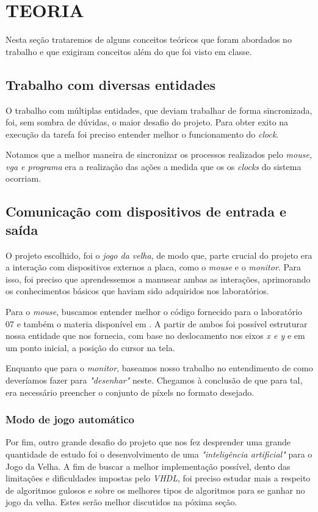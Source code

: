 \section{TEORIA}

Nesta seção trataremos de alguns conceitos teóricos que foram abordados no trabalho e que exigiram conceitos além do que foi visto em classe.

\subsection{Trabalho com diversas entidades}
O trabalho com múltiplas entidades, que deviam trabalhar de forma sincronizada, foi, sem sombra de dúvidas, o maior desafio do projeto. Para obter exito na execução da tarefa foi preciso entender melhor o funcionamento do \emph{clock}.

Notamos que a melhor maneira de sincronizar os processos realizados pelo \emph{mouse, vga e programa} era a realização das ações a medida que os os \emph{clocks} do sistema ocorriam.

\subsection{Comunicação com dispositivos de entrada e saída}
O projeto escolhido, foi o \emph{jogo da velha}, de modo que, parte crucial do projeto era a interação com dispositivos externos a placa, como o \emph{mouse} e o \emph{monitor}. Para isso, foi preciso que aprendessemos a manusear ambas as interações, aprimorando os conhecimentos básicos que haviam sido adquiridos nos laboratórios.

Para o \emph{mouse}, buscamos entender melhor o código fornecido para o laboratório 07 e também o materia disponível em \cite{ref:mouse}. A partir de ambos foi possível estruturar nossa entidade que nos fornecia, com base no deslocamento nos eixos \emph{x e y} e em um ponto inicial, a posição do cursor na tela.

Enquanto que para o \emph{monitor}, baseamos nosso trabalho no entendimento de como deveríamos fazer para \emph{"desenhar"} neste. Chegamos à conclusão de que para tal, era necessário preencher o conjunto de píxels no formato desejado.

\subsubsection{Modo de jogo automático}
Por fim, outro grande desafio do projeto que nos fez desprender uma grande quantidade de estudo foi o desenvolvimento de uma \emph{"inteligência artificial"} para o Jogo da Velha. A fim de buscar a melhor implementação possível, dento das limitações e dificuldades impostas pelo \emph{VHDL}, foi preciso estudar mais a respeito de algoritmos gulosos \cite{ref:algoritmos-gulosos} e sobre os melhores tipos de algoritmos para se ganhar no jogo da velha. Estes serão melhor discutidos na póxima seção.
